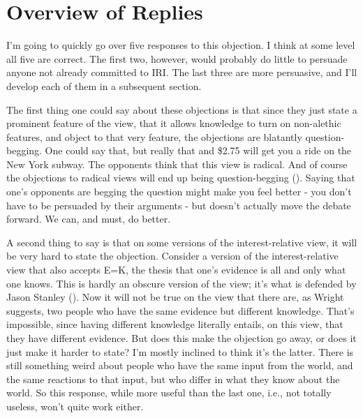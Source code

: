 \documentclass[
  12pt,
  letterpaper,
]{scrbook}
\begin{document}
\section{Overview of Replies}\label{sec-overview}

I'm going to quickly go over five responses to this objection. I think
at some level all five are correct. The first two, however, would
probably do little to persuade anyone not already committed to IRI. The
last three are more persuasive, and I'll develop each of them in a
subsequent section.

The first thing one could say about these objections is that since they
just state a prominent feature of the view, that it allows knowledge to
turn on non-alethic features, and object to that very feature, the
objections are blatantly question-begging. One could say that, but
really that and \$2.75 will get you a ride on the New York subway. The
opponents think that this view is radical. And of course the objections
to radical views will end up being question-begging
(). Saying that one's opponents
are begging the question might make you feel better - you don't have to
be persuaded by their arguments - but doesn't actually move the debate
forward. We can, and must, do better.

A second thing to say is that on some versions of the interest-relative
view, it will be very hard to state the objection. Consider a version of
the interest-relative view that also accepts E=K, the thesis that one's
evidence is all and only what one knows. This is hardly an obscure
version of the view; it's what is defended by Jason Stanley
(). Now it will not be true on the view
that there are, as Wright suggests, two people who have the same
evidence but different knowledge. That's impossible, since having
different knowledge literally entails, on this view, that they have
different evidence. But does this make the objection go away, or does it
just make it harder to state? I'm mostly inclined to think it's the
latter. There is still something weird about people who have the same
input from the world, and the same reactions to that input, but who
differ in what they know about the world. So this response, while more
useful than the last one, i.e., not totally useless, won't quite work
either.
\end{document}
